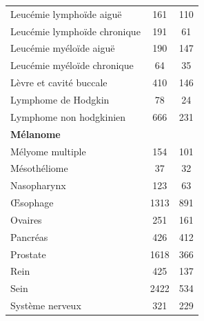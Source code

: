 \begin{table}[H]
\begin{tabular}{lSS}
        Leucémie lymphoïde aiguë                & 161                           & 110                       \\
        Leucémie lymphoïde chronique            & 191                           & 61                        \\
        Leucémie myéloïde aiguë                 & 190                           & 147                       \\
        Leucémie myéloïde chronique             & 64                            & 35                        \\
        Lèvre et cavité buccale                 & 410                           & 146                       \\
        Lymphome de Hodgkin                     & 78                            & 24                        \\
        Lymphome non hodgkinien                 & 666                           & 231                       \\
        \textbf{Mélanome}                       &                         &                      \\
        Mélyome multiple                        & 154                           & 101                       \\
        Mésothéliome                            & 37                            & 32                        \\
        Nasopharynx                             & 123                           & 63                        \\
        Œsophage                                & 1313                          & 891                       \\
        Ovaires                                 & 251                           & 161                       \\
        Pancréas                                & 426                           & 412                       \\
        Prostate                                & 1618                          & 366                       \\
        Rein                                    & 425                           & 137                       \\
        Sein                                    & 2422                          & 534                       \\
        Système nerveux                         & 321                           & 229                       \\

\end{tabular}
\end{table}
